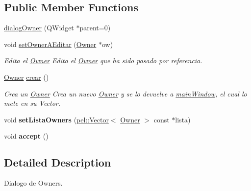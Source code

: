 \subsection*{Public Member Functions}
\begin{DoxyCompactItemize}
\item 
\hyperlink{classdialogOwner_a6d4b17329380be5d0a7aa71452e4e0a0}{dialog\+Owner} (Q\+Widget $\ast$parent=0)
\item 
\hypertarget{classdialogOwner_a9404c326bef5b7e5dfa545c614145274}{}void \hyperlink{classdialogOwner_a9404c326bef5b7e5dfa545c614145274}{set\+Owner\+A\+Editar} (\hyperlink{classOwner}{Owner} $\ast$ow)\label{classdialogOwner_a9404c326bef5b7e5dfa545c614145274}

\begin{DoxyCompactList}\small\item\em Edita el \hyperlink{classOwner}{Owner} Edita el \hyperlink{classOwner}{Owner} que ha sido pasado por referencia. \end{DoxyCompactList}\item 
\hypertarget{classdialogOwner_a1f9fbf03fba92f6133f7e419c34ad23f}{}\hyperlink{classOwner}{Owner} \hyperlink{classdialogOwner_a1f9fbf03fba92f6133f7e419c34ad23f}{crear} ()\label{classdialogOwner_a1f9fbf03fba92f6133f7e419c34ad23f}

\begin{DoxyCompactList}\small\item\em Crea un \hyperlink{classOwner}{Owner} Crea un nuevo \hyperlink{classOwner}{Owner} y se lo devuelve a \hyperlink{classmainWindow}{main\+Window}, el cual lo mete en su Vector. \end{DoxyCompactList}\item 
\hypertarget{classdialogOwner_a3f1edd5ec9383b236a812fe9e4d4d9e4}{}void {\bfseries set\+Lista\+Owners} (\hyperlink{classpel_1_1Vector}{pel\+::\+Vector}$<$ \hyperlink{classOwner}{Owner} $>$ const $\ast$lista)\label{classdialogOwner_a3f1edd5ec9383b236a812fe9e4d4d9e4}

\item 
\hypertarget{classdialogOwner_a05ce52e43ecbe984ed926e1ae8694d1e}{}void {\bfseries accept} ()\label{classdialogOwner_a05ce52e43ecbe984ed926e1ae8694d1e}

\end{DoxyCompactItemize}


\subsection{Detailed Description}
Dialogo de Owners. 

